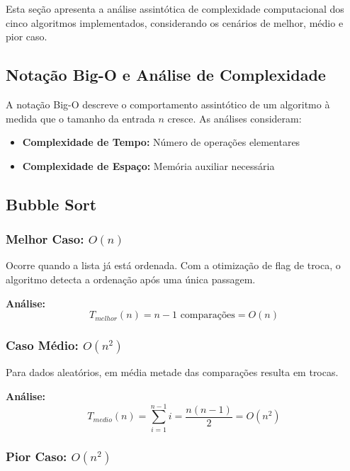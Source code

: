 \documentclass[conference]{IEEEtran}
\begin{document}
Esta seção apresenta a análise assintótica de complexidade computacional dos cinco algoritmos implementados, considerando os cenários de melhor, médio e pior caso.

\subsection{Notação Big-O e Análise de Complexidade}

A notação Big-O descreve o comportamento assintótico de um algoritmo à medida que o tamanho da entrada $n$ cresce. As análises consideram:
\begin{itemize}
    \item \textbf{Complexidade de Tempo:} Número de operações elementares
    \item \textbf{Complexidade de Espaço:} Memória auxiliar necessária
\end{itemize}

\subsection{Bubble Sort}

\subsubsection{Melhor Caso: $O(n)$}

Ocorre quando a lista já está ordenada. Com a otimização de flag de troca, o algoritmo detecta a ordenação após uma única passagem.

\textbf{Análise:}
\begin{equation}
T_{melhor}(n) = n - 1 \text{ comparações} = O(n)
\end{equation}

\subsubsection{Caso Médio: $O(n^2)$}

Para dados aleatórios, em média metade das comparações resulta em trocas.

\textbf{Análise:}
\begin{equation}
T_{medio}(n) = \sum_{i=1}^{n-1} i = \frac{n(n-1)}{2} = O(n^2)
\end{equation}

\subsubsection{Pior Caso: $O(n^2)$}
\end{document}
